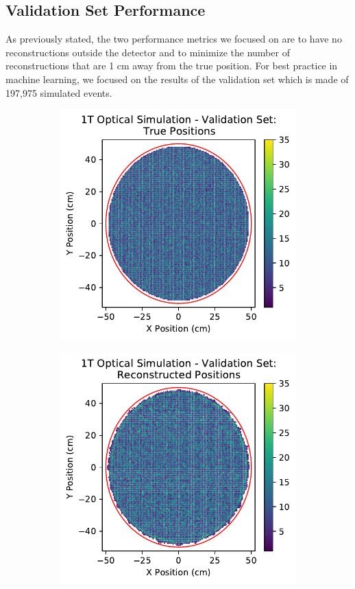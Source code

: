 \subsection{Validation Set Performance}
As previously stated, the two performance metrics we focused on are to have no reconstructions outside the detector and to minimize the number of reconstructions that are 1 cm away from the true position.
For best practice in machine learning, we focused on the results of the validation set which is made of 197,975 simulated events.
\begin{figure}[t]
	\centering
	\begin{subfigure}[b]{0.45\textwidth}
		\centering
		\includegraphics[width=\textwidth]{figures/optsim_val_true_pos.pdf}
	\end{subfigure}
	\hfill
	\begin{subfigure}[b]{0.45\textwidth}
		\centering
		\includegraphics[width=\textwidth]{figures/optsim_val_reco_pos.pdf}

\end{subfigure}
\end{figure}
